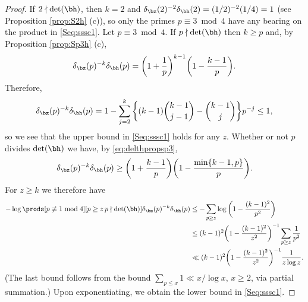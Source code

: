 \documentclass[12pt, reqno, twoside, letterpaper]{amsart}
\begin{document}
\begin{nixnix}
\begin{proof}
If $2 \nmid \det(\bh)$, then $k = 2$ and 
$\delta_{\bz}(2)^{-2}\delta_{\bh}(2) = (1/2)^{-2}(1/4) = 1$ (see 
Proposition \ref{prop:S2h} (c)), so only the primes 
$p \equiv 3 \bmod 4$ have any bearing on the product in 
\eqref{Seq:sssc1}.
%
Let $p \equiv 3 \bmod 4$.
%
If $p \nmid \det(\bh)$ then $k \ge p$ and, by 
Proposition \ref{prop:Sp3h} (c),  
\[
  \delta_{\bz}(p)^{-k}\delta_{\bh}(p)
  =
   \bigg(
    1 + \frac{1}{p}
   \bigg)^{k - 1}
   \bigg(
    1 - \frac{k - 1}{p}
   \bigg).   
\]
%
Therefore, 
\[
  \delta_{\bz}(p)^{-k}\delta_{\bh}(p)
   =
    1 
    - 
     \sum_{j = 2}^k 
      \bigg\{
       (k - 1)\binom{k - 1}{j - 1} - \binom{k - 1}{j}
      \bigg\}
      p^{-j}
       \le 
        1,
\]
so we see that the upper bound in \eqref{Seq:sssc1} 
holds for any $z$.
%
Whether or not $p$ divides $\det(\bh)$ we have, by 
\eqref{eq:delthpropsp3}, 
\begin{equation}
 \label{Seq:ssscpf1}
 \delta_{\bz}(p)^{-k}\delta_{\bh}(p)
  \ge
   \bigg(1 + \frac{k - 1}{p}\bigg)
    \bigg(1 - \frac{\min\{k - 1,p\}}{p}\bigg).
\end{equation}
%
For $z \ge k$ we therefore have 
\begin{align}
 \begin{split}
  \label{Seq:ssscpf2} 
  -\log \prods[p \not\equiv 1 \bmod 4][p \ge z \, p \nmid \det(\bh)]
    \delta_{\bz}(p)^{-k}\delta_{\bh}(p) 
 &
      \le 
      -\sum_{p \ge z} \log\bigg(1 - \frac{(k - 1)^2}{p^2}\bigg)
 \\
 & 
     \le 
      (k - 1)^2\bigg(1 - \frac{(k - 1)^2}{z^2}\bigg)^{-1}
       \sum_{p \ge z}
        \frac{1}{p^2}
 \\
 & 
    \ll 
     (k - 1)^2\bigg(1 - \frac{(k - 1)^2}{z^2}\bigg)^{-1}  
      \frac{1}{z\log z}.
 \end{split}
\end{align}
%
(The last bound follows from the bound 
$\sum_{p \le x} 1 \ll x/\log x$, $x \ge 2$, via partial 
summation.)
%
Upon exponentiating, we obtain the lower bound in 
\eqref{Seq:sssc1}.


\end{proof}
\end{nixnix}
\end{document}
